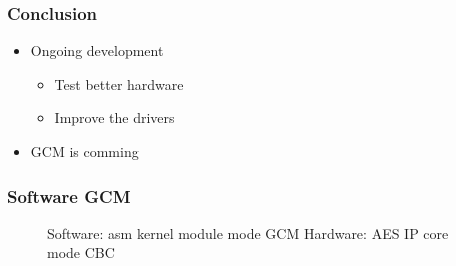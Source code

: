 \documentclass[xcolor={x11names, rgb, usenames, dvipsnames}]{beamer}
\begin{document}
\begin{frame}
\frametitle{Conclusion}
\begin{itemize}
	\item Ongoing development
	\begin{itemize}
		\item Test better hardware
		\item Improve the drivers
	\end{itemize}
	\item GCM is comming
\end{itemize}

\end{frame}






\begin{frame}[noframenumbering]
\frametitle{Software GCM}
	\begin{figure}
	
	\caption{Software: asm kernel module mode GCM\newline{} Hardware: AES IP core mode CBC}
	\end{figure}
\end{frame}



% 
% 
\end{document}
